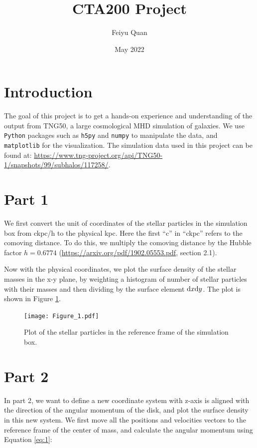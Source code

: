 \documentclass[12pt]{article}
\title{CTA200 Project}
\author{Feiyu Quan}
\date{May 2022}
\begin{document}
\maketitle

\section{Introduction}

The goal of this project is to get a hands-on experience and understanding of the output from TNG50, a large cosmological MHD simulation of galaxies. We use \texttt{Python} packages such as \texttt{h5py} and \texttt{numpy} to manipulate the data, and \texttt{matplotlib} for the visualization. The simulation data used in this project can be found at: \url{https://www.tng-project.org/api/TNG50-1/snapshots/99/subhalos/117258/}.


\section{Part 1}

We first convert the unit of coordinates of the stellar particles in the simulation box from ckpc/h to the physical kpc. Here the first \enquote{c} in \enquote{ckpc} refers to the comoving distance. To do this, we multiply the comoving distance by the Hubble factor $h = 0.6774$ (\url{https://arxiv.org/pdf/1902.05553.pdf}, section 2.1).

Now with the physical coordinates, we plot the surface density of the stellar masses in the x-y plane, by weighting a histogram of number of stellar particles with their masses and then dividing by the surface element ${\rm d}x {\rm d}y$. The plot is shown in Figure \ref{Fig1}.

\begin{figure}[ht]
    \centering
    \texttt{[image: Figure\_1.pdf]}
    \caption{Plot of the stellar particles in the reference frame of the simulation box.}
    \label{Fig1}
\end{figure}


\section{Part 2}

In part 2, we want to define a new coordinate system with z-axis is aligned with the direction of the angular momentum of the disk, and plot the surface density in this new system. We first move all the positions and velocities vectors to the reference frame of the center of mass, and calculate the angular momentum using Equation \ref{eq:1}:
\end{document}
